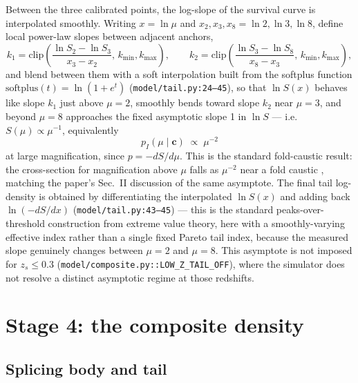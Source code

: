 \documentclass[11pt]{article}
\newcommand{\file}[1]{\texttt{#1}}
\newcommand{\vect}[1]{\boldsymbol{#1}}
\begin{document}
Between the three calibrated points, the log-slope of the survival curve is
interpolated smoothly. Writing $x=\ln\mu$ and $x_2,x_3,x_8=\ln 2,\ln
3,\ln 8$, define local power-law slopes between adjacent anchors,
\begin{equation}
 k_1 = \mathrm{clip}\!\left(\frac{\ln S_2-\ln S_3}{x_3-x_2},\,k_{\min},k_{\max}\right),
 \qquad
 k_2 = \mathrm{clip}\!\left(\frac{\ln S_3-\ln S_8}{x_8-x_3},\,k_{\min},k_{\max}\right),
\end{equation}
and blend between them with a soft interpolation built from the softplus
function $\mathrm{softplus}(t)=\ln(1+e^t)$ (\file{model/tail.py:24–45}), so
that $\ln S(x)$ behaves like slope $k_1$ just above $\mu=2$, smoothly bends
toward slope $k_2$ near $\mu=3$, and beyond $\mu=8$ approaches the fixed
asymptotic slope 1 in $\ln S$ — i.e.\ $S(\mu)\propto\mu^{-1}$, equivalently
\begin{equation}
 p_I(\mu\mid\vect c) \;\propto\; \mu^{-2}
 \label{eq:tailasymptote}
\end{equation}
at large magnification, since $p=-dS/d\mu$. This is the standard fold-caustic
result: the cross-section for magnification above $\mu$ falls as $\mu^{-2}$
near a fold caustic \cite{Blandford:1986zz}, matching the paper's Sec.~II
discussion of the same asymptote. The final tail log-density is obtained by
differentiating the interpolated $\ln S(x)$ and adding back $\ln(-dS/dx)$
(\file{model/tail.py:43–45}) — this is the standard peaks-over-threshold
construction from extreme value theory, here with a smoothly-varying
effective index rather than a single fixed Pareto tail index, because the
measured slope genuinely changes between $\mu=2$ and $\mu=8$. This
asymptote is not imposed for $z_s\le0.3$
(\file{model/composite.py::LOW\_Z\_TAIL\_OFF}), where the simulator does
not resolve a distinct asymptotic regime at those redshifts.

\section{Stage 4: the composite density}
\label{sec:composite}

\subsection{Splicing body and tail}
\end{document}
